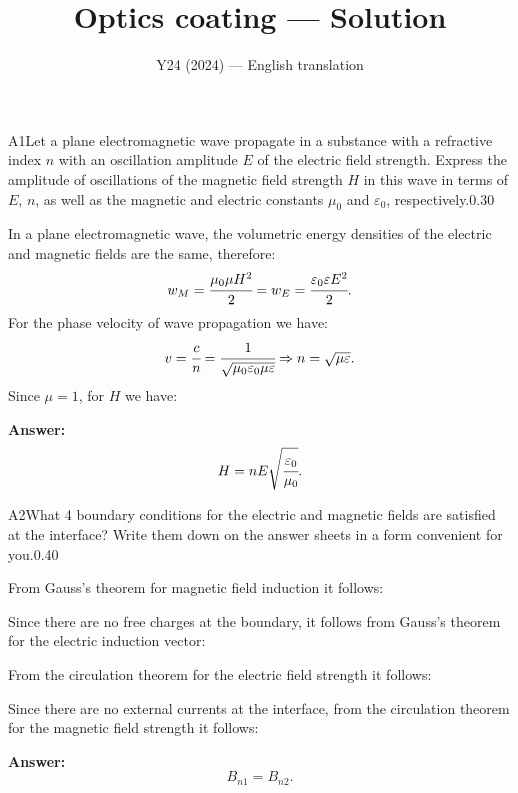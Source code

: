 \documentclass[11pt,a4paper]{article}
\title{\textbf{Optics coating --- Solution}}
\author{\normalsize Y24 (2024) — English translation}
\date{}
\begin{document}
\maketitle\vspace{-0.5em}
\begin{solcard}{A1}{Let a plane electromagnetic wave propagate in a substance with a refractive index $n$ with an oscillation amplitude $E$ of the electric field strength. Express the amplitude of oscillations of the magnetic field strength $H$ in this wave in terms of $E$, $n$, as well as the magnetic and electric constants $\mu_0$ and $\varepsilon_0$, respectively.}{0.30}

In a plane electromagnetic wave, the volumetric energy densities of the electric and magnetic fields are the same, therefore: $$w_M=\cfrac{\mu_0\mu H^2}{2}=w_E=\cfrac{\varepsilon_0\varepsilon E^2}{2}{.} $$For the phase velocity of wave propagation we have: $$v=\cfrac{c}{n}=\cfrac{1}{\sqrt{\mu_0\varepsilon_0\mu\varepsilon}}\Rightarrow n=\sqrt{\mu\varepsilon}{.} $$ Since $\mu=1$, for $H$ we have:

\par\smallskip\noindent\textbf{Answer:} $$H=nE\sqrt{\cfrac{\varepsilon_0}{\mu_0}}{.} $$
\end{solcard}

\begin{solcard}{A2}{What 4 boundary conditions for the electric and magnetic fields are satisfied at the interface? Write them down on the answer sheets in a form convenient for you.}{0.40}

From Gauss’s theorem for magnetic field induction it follows:


Since there are no free charges at the boundary, it follows from Gauss’s theorem for the electric induction vector:


From the circulation theorem for the electric field strength it follows:


Since there are no external currents at the interface, from the circulation theorem for the magnetic field strength it follows:

\par\smallskip\noindent\textbf{Answer:} $$B_{n1}=B_{n2}{.} $$
\end{solcard}
\end{document}
